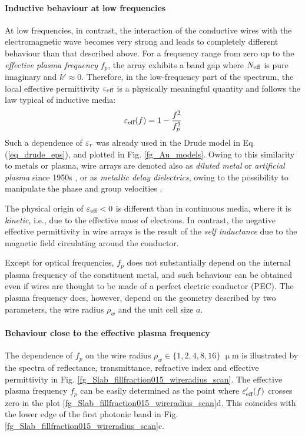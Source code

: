 \paragraph{Inductive behaviour at low frequencies}%
At low frequencies, in contrast, the interaction of the conductive wires with the electromagnetic wave becomes very strong and leads to completely different behaviour than that described above. For a frequency range from zero up to the \textit{effective plasma frequency} $f_p$, the array exhibits a band gap where $N_{\text{eff} }$ is pure imaginary and $k'\approx 0$. Therefore, in the low-frequency part of the spectrum, the local effective permittivity $\varepsilon_{\text{eff} }$ is a physically meaningful quantity and follows the law typical of inductive media:
\begin{equation} \varepsilon_{\text{eff} }(f) = 1 - \frac{f^{2}}{f_p^{2}}\label{eq_eeff_plasma}\end{equation}
Such a dependence of $\varepsilon_r$ was already used in the Drude model in Eq. (\ref{eq_drude_eps}), and plotted in Fig. \ref{fg_Au_models}. Owing to this similarity to metals or plasma, wire arrays are denoted also as \textit{diluted metal} or \textit{artificial plasma} since 1950s \cite{merkel1973simulation, rotman1962plasma}, or as \textit{metallic delay dielectrics}, owing to the possibility to manipulate the phase and group velocities  \cite[p. 54]{brown1953artificial}.

The physical origin of $\varepsilon_{\text{eff} }<0$ is different than in continuous media, where it is \textit{kinetic}, i.e., due to the effective mass of electrons. In contrast, the negative effective permittivity in wire arrays is the result of the \textit{self inductance} due to the magnetic field circulating around the conductor. 

Except for optical frequencies, $f_p$ does not substantially depend on the internal plasma frequency of the constituent metal, and such behaviour can be obtained even if wires are thought to be made of a perfect electric conductor (PEC).
The plasma frequency does, however, depend on the geometry described by two parameters, the wire radius $\rho_w$ and the unit cell size $a$. 

\paragraph{Behaviour close to the effective plasma frequency}%
The dependence of $f_p$ on the wire radius $\rho_w \in \{1, 2, 4, 8, 16\}$ $\upmu$m is illustrated by the spectra of reflectance, transmittance, refractive index and effective permittivity in Fig. \ref{fg_Slab_fillfraction015_wireradius_scan}. The effective plasma frequency $f_p$ can be easily determined as the point where $\varepsilon_{\text{eff} }'(f)$ crosses zero  in the plot \ref{fg_Slab_fillfraction015_wireradius_scan}d. This coincides with the lower edge of the first photonic band in Fig. \ref{fg_Slab_fillfraction015_wireradius_scan}c. 

